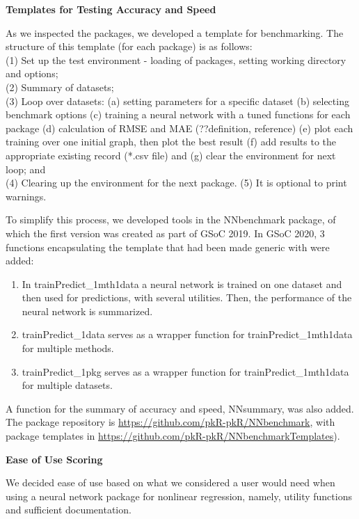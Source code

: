 \textbf{Templates for Testing Accuracy and Speed}

As we inspected the packages, we developed a template for benchmarking.
The structure of this template (for each package) is as follows:\\
(1) Set up the test environment - loading of packages, setting working
directory and options;\\
(2) Summary of datasets;\\
(3) Loop over datasets: (a) setting parameters for a specific dataset
(b) selecting benchmark options (c) training a neural network with a
tuned functions for each package (d) calculation of RMSE and MAE
(??definition, reference) (e) plot each training over one initial graph,
then plot the best result (f) add results to the appropriate existing
record (*.csv file) and (g) clear the environment for next loop; and\\
(4) Clearing up the environment for the next package. (5) It is optional
to print warnings.

To simplify this process, we developed tools in the NNbenchmark package,
of which the first version was created as part of GSoC 2019. In GSoC
2020, 3 functions encapsulating the template that had been made generic
with  were added:

\begin{enumerate}
\def\labelenumi{\arabic{enumi}.}
\tightlist
\item
  In trainPredict\_1mth1data a neural network is trained on one dataset
  and then used for predictions, with several utilities. Then, the
  performance of the neural network is summarized.
\item
  trainPredict\_1data serves as a wrapper function for
  trainPredict\_1mth1data for multiple methods.
\item
  trainPredict\_1pkg serves as a wrapper function for
  trainPredict\_1mth1data for multiple datasets.
\end{enumerate}

A function for the summary of accuracy and speed, NNsummary, was also
added. The package repository is
\url{https://github.com/pkR-pkR/NNbenchmark}, with package templates in
\url{https://github.com/pkR-pkR/NNbenchmarkTemplates}).

\textbf{Ease of Use Scoring}

We decided ease of use based on what we considered a user would need
when using a neural network package for nonlinear regression, namely,
utility functions and sufficient documentation.

